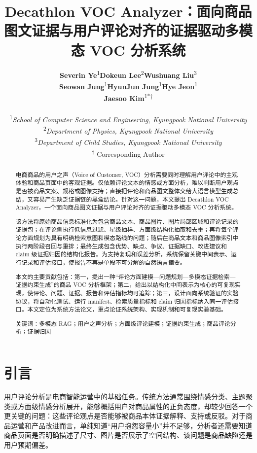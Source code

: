 \documentclass[11pt]{article}
\title{\textbf{Decathlon VOC Analyzer：面向商品图文证据与用户评论对齐的证据驱动多模态 VOC 分析系统}}
\author{{\small
\begin{tabular}{@{}ccc@{}}
\parbox[t]{0.3067\textwidth}{\centering \textbf{Severin Ye}\textsuperscript{1}} & \parbox[t]{0.3067\textwidth}{\centering \textbf{Dokeun Lee}\textsuperscript{2}} & \parbox[t]{0.3067\textwidth}{\centering \textbf{Wushuang Liu}\textsuperscript{3}} \\[0.9em]
\parbox[t]{0.3067\textwidth}{\centering \textbf{Seowan Jung}\textsuperscript{1}} & \parbox[t]{0.3067\textwidth}{\centering \textbf{HyunJun Jung}\textsuperscript{1}} & \parbox[t]{0.3067\textwidth}{\centering \textbf{Hye Jeon}\textsuperscript{1}} \\[0.9em]
\parbox[t]{0.3067\textwidth}{} & \parbox[t]{0.3067\textwidth}{\centering \textbf{Jaesoo Kim}\textsuperscript{1*†}} & \parbox[t]{0.3067\textwidth}{} \\
\multicolumn{3}{c}{} \\[0.45em]
\multicolumn{3}{c}{\parbox{0.9200\textwidth}{\centering\small\textsuperscript{1}\textit{School of Computer Science and Engineering, Kyungpook National University}}} \\
\multicolumn{3}{c}{\parbox{0.9200\textwidth}{\centering\small\textsuperscript{2}\textit{Department of Physics, Kyungpook National University}}} \\
\multicolumn{3}{c}{\parbox{0.9200\textwidth}{\centering\small\textsuperscript{3}\textit{Department of Child Studies, Kyungpook National University}}} \\
\multicolumn{3}{c}{\small \textsuperscript{†}  Corresponding Author} \\
\end{tabular}
}}
\date{} %
\begin{document}
\maketitle
\nocite{lewis2020retrievalAugmentedGeneration,gao2023rarr,radford2021clip,liu2024structuredOutputBenchmark,geng2023grammarConstrainedDecoding,yao2023react,nvidia2024multimodalRagIntro,nvidia2024aiReadyKnowledgeSystems,faysse2024colpali,pontiki2014semevalAspect,qdrant2024pdfRetrievalAtScale,qdrant2024multiVectorCourse,manning2008introductionIr}

\begin{abstract}
电商商品的用户之声（Voice of Customer, VOC）分析需要同时理解用户评论中的主观体验和商品页面中的客观证据。仅依赖评论文本的情感或方面分析，难以判断用户观点是否被商品文案、规格或图像支持；直接把评论和商品图文整体交给大语言模型生成总结，又容易产生缺乏证据链的黑盒结论。针对这一问题，本文提出 Decathlon VOC Analyzer，一个面向商品图文证据与用户评论对齐的证据驱动多模态 VOC 分析系统。

该方法将原始商品信息标准化为包含商品文本、商品图片、图片局部区域和评论记录的证据包；在评论侧执行低信息过滤、星级抽样、方面级结构化抽取和去重；再将每个评论方面规划为具有明确检索意图和模态路线的问题；随后在商品文本和商品图像索引中执行两阶段召回与重排；最终生成包含优势、缺点、争议、证据缺口、改进建议和 claim 级证据归因的结构化报告。为支持复现和误差分析，系统保留关键中间表示、运行记录和评估接口，使报告不再是单段不可分解的自然语言摘要。

本文的主要贡献包括：第一，提出一种``评论方面建模---问题规划---多模态证据检索---证据约束生成''的商品 VOC 分析框架；第二，给出以结构化中间表示为核心的可复现实现，使评论、问题、证据、报告和评估指标均可追踪；第三，设计面向系统验证的实验协议，将自动化测试、运行 manifest、检索质量指标和 claim 归因指标纳入同一评估接口。本文定位为系统方法论文，重点论证系统架构、实现机制和可复现实验基础。

关键词：多模态 RAG；用户之声分析；方面级评论建模；证据约束生成；商品评论分析；证据归因
\end{abstract}

\section{引言}
用户评论分析是电商智能运营中的基础任务。传统方法通常围绕情感分类、主题聚类或方面级情感分析展开，能够概括用户对商品属性的正负态度，却较少回答一个更关键的问题：这些评论观点是否能够被商品本体证据解释、支持或反驳。对于商品运营和产品改进而言，单纯知道``用户抱怨容量小''并不足够，分析者还需要知道商品页面是否明确描述了尺寸、图片是否展示了空间结构、该问题是商品缺陷还是用户预期偏差。
\end{document}
